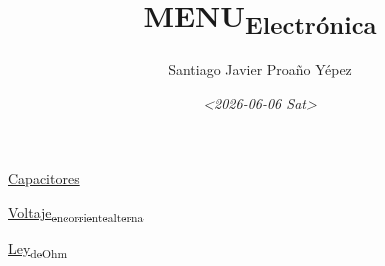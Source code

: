 \documentclass[11pt]{article}
\author{Santiago Javier Proaño Yépez}
\date{\textit{<2026-06-06 Sat>}}
\title{MENU\textsubscript{Electrónica}}
\begin{document}
\maketitle
\tableofcontents

\href{Capacitores.org}{Capacitores}


\href{Voltaje_en_corriente_alterna.org}{Voltaje\textsubscript{en}\textsubscript{corriente}\textsubscript{alterna}}


\href{Ley_de_Ohm.org}{Ley\textsubscript{de}\textsubscript{Ohm}}
\end{document}
